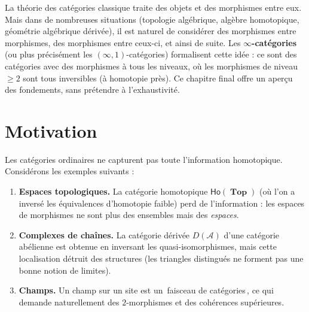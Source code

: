 \documentclass[a4paper,12pt]{book}
\DeclareMathOperator{\Top}{\mathbf{Top}}
\providecommand{\og}{\guillemotleft\,}
\providecommand{\fg}{\,\guillemotright}
\begin{document}
\vspace{1em}

La théorie des catégories classique traite des objets et des morphismes
entre eux.  Mais dans de nombreuses situations (topologie algébrique,
algèbre homotopique, géométrie algébrique dérivée), il est naturel
de considérer des morphismes entre morphismes, des morphismes entre
ceux-ci, et ainsi de suite.  Les \textbf{$\infty$-catégories}
(ou plus précisément les $(\infty,1)$-catégories) formalisent cette
idée : ce sont des catégories avec des morphismes à tous les niveaux,
où les morphismes de niveau $\geq 2$ sont tous inversibles (à homotopie
près).  Ce chapitre final offre un aperçu des fondements, sans
prétendre à l'exhaustivité.


\section{Motivation}\label{sec:infty-motivation}

Les catégories ordinaires ne capturent pas toute l'information
homotopique.  Considérons les exemples suivants :

\begin{enumerate}[label=(\roman*)]
\item \textbf{Espaces topologiques.}
      La catégorie homotopique $\mathsf{Ho}(\Top)$ (où l'on a inversé
      les équivalences d'homotopie faible) perd de l'information :
      les espaces de morphismes ne sont plus des ensembles mais des
      \emph{espaces}.

\item \textbf{Complexes de chaînes.}
      La catégorie dérivée $D(\mathcal{A})$ d'une catégorie abélienne
      est obtenue en inversant les quasi-isomorphismes, mais cette
      localisation détruit des structures (les triangles distingués
      ne forment pas une bonne notion de limites).

\item \textbf{Champs.}
      Un champ sur un site est un \og faisceau de catégories\fg{}, ce
      qui demande naturellement des $2$-morphismes et des cohérences
      supérieures.
\end{enumerate}
\end{document}
